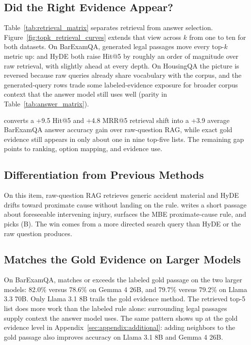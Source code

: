 

\subsection{Did the Right Evidence Appear?}





Table~\ref{tab:retrieval_matrix} separates retrieval from answer selection.
Figure~\ref{fig:topk_retrieval_curves} extends that view across $k$ from
one to ten for both datasets. On BarExamQA, generated legal passages move
every top-$k$ metric up: \hyre{} and HyDE both raise Hit@5 by roughly an
order of magnitude over raw retrieval, with \hyre{} slightly ahead at every
depth. On HousingQA the picture is reversed because raw queries already
share vocabulary with the corpus, and the generated-query rows trade some
labeled-evidence exposure for broader corpus context that the answer model
still uses well (parity in Table~\ref{tab:answer_matrix}).

\hyre{} converts a +9.5\pp{} Hit@5 and +4.8\pp{} MRR@5 retrieval shift into
a +3.9\pp{} average BarExamQA answer accuracy gain over raw-question RAG,
while exact gold evidence still appears in only about one in nine top-five
lists. The remaining gap points to ranking, option mapping, and evidence
use.

\subsection{Differentiation from Previous Methods}

On this item, raw-question RAG retrieves generic accident material and
HyDE drifts toward proximate cause without landing on the rule. \hyre{}
writes a short passage about foreseeable intervening injury, surfaces the
MBE proximate-cause rule, and picks (B). The win comes from a more
directed search query than HyDE or the raw question produces.

\subsection{\hyre{} Matches the Gold Evidence on Larger Models}

On BarExamQA, \hyre{} matches or exceeds the labeled gold passage on the
two larger models: 82.0\% versus 78.6\% on Gemma 4 26B, and 79.7\% versus
79.2\% on Llama 3.3 70B. Only Llama 3.1 8B trails the gold evidence method. The retrieved
top-5 list does more work than the labeled rule alone: surrounding legal
passages supply context the answer model uses. The same pattern shows up
at the gold evidence level in Appendix~\ref{sec:appendix:additional}: adding
neighbors to the gold passage also improves accuracy on Llama 3.1 8B and
Gemma 4 26B.

